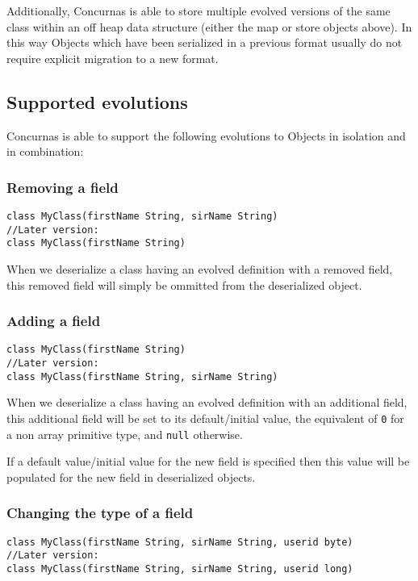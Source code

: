 \documentclass[conc-doc]{subfiles}
\begin{document}
Additionally, Concurnas is able to store multiple evolved versions of the same class within an off heap data structure (either the map or store objects above). In this way Objects which have been serialized in a previous format usually do not require explicit migration to a new format.

\subsection{Supported evolutions}
Concurnas is able to support the following evolutions to Objects in isolation and in combination:

\subsubsection{Removing a field}
\begin{lstlisting}
class MyClass(firstName String, sirName String)
//Later version:
class MyClass(firstName String)
\end{lstlisting}

When we deserialize a class having an evolved definition with a removed field, this removed field will simply be ommitted from the deserialized object.

\subsubsection{Adding a field}
\begin{lstlisting}
class MyClass(firstName String)
//Later version:
class MyClass(firstName String, sirName String)
\end{lstlisting}

When we deserialize a class having an evolved definition with an additional field, this additional field will be set to its default/initial value, the equivalent of \lstinline{0} for a non array primitive type, and \lstinline{null} otherwise.

If a default value/initial value for the new field is specified then this value will be populated for the new field in deserialized objects.

\subsubsection{Changing the type of a field}
\begin{lstlisting}
class MyClass(firstName String, sirName String, userid byte)
//Later version:
class MyClass(firstName String, sirName String, userid long)
\end{lstlisting}
\end{document}
